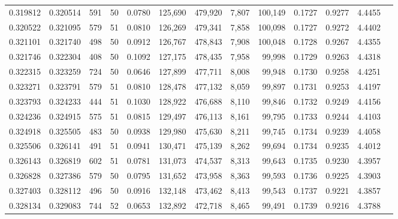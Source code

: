 \begin{tabular}{rrrrrrrrrrrrr}
0.319812 & 0.320514 &   591 &  50 &                                     0.0780 & 125,690 & 479,920 &   7,807 & 100,149 & 0.1727 & 0.9277 & 4.4455 \\
0.320522 & 0.321095 &   579 &  51 &                                     0.0810 & 126,269 & 479,341 &   7,858 & 100,098 & 0.1727 & 0.9272 & 4.4402 \\
0.321101 & 0.321740 &   498 &  50 &                                     0.0912 & 126,767 & 478,843 &   7,908 & 100,048 & 0.1728 & 0.9267 & 4.4355 \\
0.321746 & 0.322304 &   408 &  50 &                                     0.1092 & 127,175 & 478,435 &   7,958 &  99,998 & 0.1729 & 0.9263 & 4.4318 \\
0.322315 & 0.323259 &   724 &  50 &                                     0.0646 & 127,899 & 477,711 &   8,008 &  99,948 & 0.1730 & 0.9258 & 4.4251 \\
0.323271 & 0.323791 &   579 &  51 &                                     0.0810 & 128,478 & 477,132 &   8,059 &  99,897 & 0.1731 & 0.9253 & 4.4197 \\
0.323793 & 0.324233 &   444 &  51 &                                     0.1030 & 128,922 & 476,688 &   8,110 &  99,846 & 0.1732 & 0.9249 & 4.4156 \\
0.324236 & 0.324915 &   575 &  51 &                                     0.0815 & 129,497 & 476,113 &   8,161 &  99,795 & 0.1733 & 0.9244 & 4.4103 \\
0.324918 & 0.325505 &   483 &  50 &                                     0.0938 & 129,980 & 475,630 &   8,211 &  99,745 & 0.1734 & 0.9239 & 4.4058 \\
0.325506 & 0.326141 &   491 &  51 &                                     0.0941 & 130,471 & 475,139 &   8,262 &  99,694 & 0.1734 & 0.9235 & 4.4012 \\
0.326143 & 0.326819 &   602 &  51 &                                     0.0781 & 131,073 & 474,537 &   8,313 &  99,643 & 0.1735 & 0.9230 & 4.3957 \\
0.326828 & 0.327386 &   579 &  50 &                                     0.0795 & 131,652 & 473,958 &   8,363 &  99,593 & 0.1736 & 0.9225 & 4.3903 \\
0.327403 & 0.328112 &   496 &  50 &                                     0.0916 & 132,148 & 473,462 &   8,413 &  99,543 & 0.1737 & 0.9221 & 4.3857 \\
0.328134 & 0.329083 &   744 &  52 &                                     0.0653 & 132,892 & 472,718 &   8,465 &  99,491 & 0.1739 & 0.9216 & 4.3788 \\

\end{tabular}
